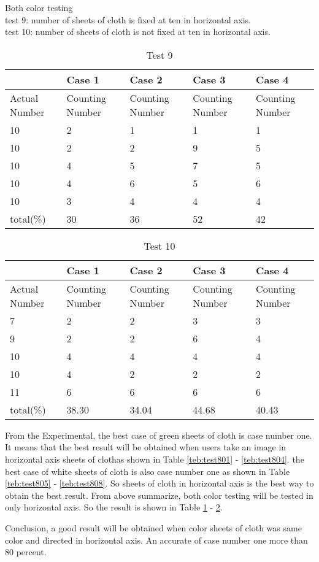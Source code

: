 Both color testing\\ 
test 9: number of sheets of cloth is fixed at ten in horizontal axis.\\  
test 10: number of sheets of cloth is not fixed at ten in horizontal axis.\\
\begin{table}[t]
	\centering
	\begin{tabular}{|p{1.5cm}|p{1.5cm}|p{1.5cm}|p{1.5cm}|p{1.5cm}|}
		\hline
		& Case 1 & Case 2 & Case 3 & Case 4\\
		\hline
		Actual Number & Counting Number & Counting Number & Counting Number & Counting Number\\
		\hline
	10	& 	2	&  	1	&  	1	& 1	\\
	10	& 	 2	& 	2	& 	9	& 5	\\
	10	& 	4	&	5	& 	7	& 5	\\
	10	& 	4	& 	6	& 	5	& 6	\\
	10	& 	3	& 	4	& 	4	& 4	\\
		total(\%)& 	30	&	36	&	52	& 42\\
		\hline
	\end{tabular}
	\caption{Test 9} \label{teb:test809}
\end{table}
\begin{table}[t]
	\centering
	\begin{tabular}{|p{1.5cm}|p{1.5cm}|p{1.5cm}|p{1.5cm}|p{1.5cm}|}
		\hline
		& Case 1 & Case 2 & Case 3 & Case 4\\
		\hline
		Actual Number & Counting Number & Counting Number & Counting Number & Counting Number\\
		\hline
	7	& 	2	&  	2	&  	3	& 3	\\
	9	& 	 2	& 	2	& 	6	& 4	\\
	10	& 	4	&	4	& 	4	& 4	\\
	10	& 	4	& 	2	& 	2	& 2	\\
	11	& 	6	& 	6	& 	6	& 6	\\
		total(\%)& 	38.30	&	34.04	&	44.68	& 40.43\\
		\hline
	\end{tabular}
	\caption{Test 10} \label{teb:test8010}
\end{table}

From the Experimental, the best case of green sheets of cloth is case number one. It means that the best result will be obtained when users take an image in horizontal axis sheets of clothas shown in Table \ref{teb:test801} - \ref{teb:test804}. the best case of white sheets of cloth is also case number one as shown in Table \ref{teb:test805} - \ref{teb:test808}. So sheets of cloth in horizontal axis is the best way to obtain the best result. 
 From above summarize, both color testing will be tested in only horizontal axis. So the result is shown in Table \ref{teb:test809} - \ref{teb:test8010}. 
 
 Conclusion, a good result will be obtained when color sheets of cloth was same color and directed in horizontal axis. An accurate of case number one more than 80 percent.